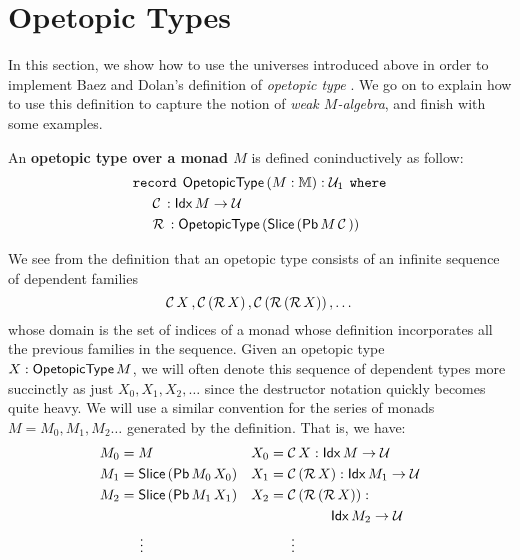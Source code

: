 \section{Opetopic Types}
\label{sec:opetopic-types}

In this section, we show how to use the universes introduced above in
order to implement Baez and Dolan's definition of \emph{opetopic type}
\cite{BD98}.  We go on to explain how to use this definition to capture
the notion of \emph{weak $M$-algebra}, and finish with some examples.

\begin{defn}
  An \textbf{opetopic type over a monad $M$} is defined coninductively
  as follow:
  \begin{align*}
    &\texttt{record}\hspace{1ex} \mathsf{OpetopicType}\, (M : \mathbb{M}) : \mathcal{U}_1 \hspace{1ex} \texttt{where} \\
    &\hspace{.5cm}\mathcal{C}\, : \mathsf{Idx}\, M \to \mathcal{U} \\
    &\hspace{.5cm}\mathcal{R}\, : \mathsf{OpetopicType}\, (\mathsf{Slice}\, (\mathsf{Pb}\, M\, \mathcal{C}\,))
  \end{align*}
\end{defn}
We see from the definition that an opetopic type consists of
an infinite sequence of dependent families
\[ \mathcal{C}\, X \,, \mathcal{C}\, (\mathcal{R}\, X) \,, \mathcal{C}\, (\mathcal{R}\, (\mathcal{R}\, X)) \,, \dots \]
whose domain is the set of indices of a monad whose definition
incorporates all the previous families in the sequence.  Given an
opetopic type $X : \mathsf{OpetopicType}\, M$, we will often denote this sequence of
dependent types more succinctly as just $X_0, X_1, X_2, \dots$ since
the destructor notation quickly becomes quite heavy.  We will use a
similar convention for the series of monads $M = M_0, M_1, M_2 \dots$
generated by the definition.  That is, we have:
\begin{equation}
  \label{eq:unfold}
  \begin{aligned}
    &M_0 = M && X_0 = \mathcal{C}\, X : \mathsf{Idx}\, M \to \mathcal{U} \\
    &M_1 = \mathsf{Slice}\, (\mathsf{Pb}\, M_0\, X_0) && X_1 = \mathcal{C}\, (\mathcal{R}\, X) : \mathsf{Idx}\, M_1 \to \mathcal{U} \\
    &M_2 = \mathsf{Slice}\, (\mathsf{Pb}\, M_1\, X_1) && X_2 = \mathcal{C}\, (\mathcal{R}\, (\mathcal{R}\, X)) : \\
    &&&\hspace{2cm} \mathsf{Idx}\, M_2 \to \mathcal{U} \\
    &\hspace{1cm} \vdots && \hspace{1cm} \vdots
  \end{aligned}
\end{equation}

